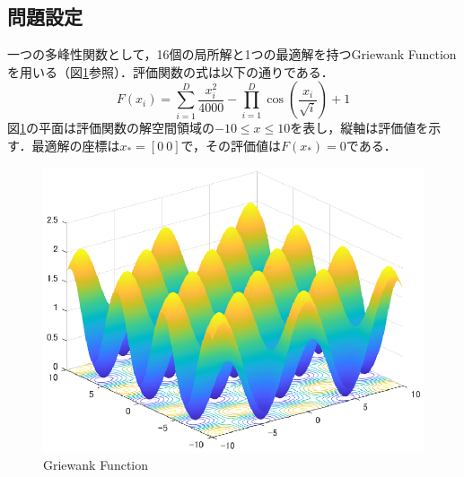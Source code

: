 \documentclass[twocolumn, a4paper]{UECIEresume}
\begin{document}
\subsection{問題設定}
一つの多峰性関数として，16個の局所解と1つの最適解を持つGriewank Functionを用いる（図\ref{fig:griewank}参照）．評価関数の式は以下の通りである．
\begin{equation}
F(x_i)=\sum_{i=1}^D \frac{x_i^2}{4000}- \prod_{i=1}^D \cos( \frac{x_i}{\sqrt{i}})+1
\end{equation}
図\ref{fig:griewank}の平面は評価関数の解空間領域の$-10 \leq x \leq 10$を表し，縦軸は評価値を示す．最適解の座標は$x_*=[0 \ 0]$で，その評価値は$F(x_*)=0$である．
\begin{figure}[t]
\begin{center}
\includegraphics[width=0.8\linewidth]{eps/griewank.eps}
\caption{Griewank Function}
\label{fig:griewank}
\end{center}
\end{figure}
\end{document}

